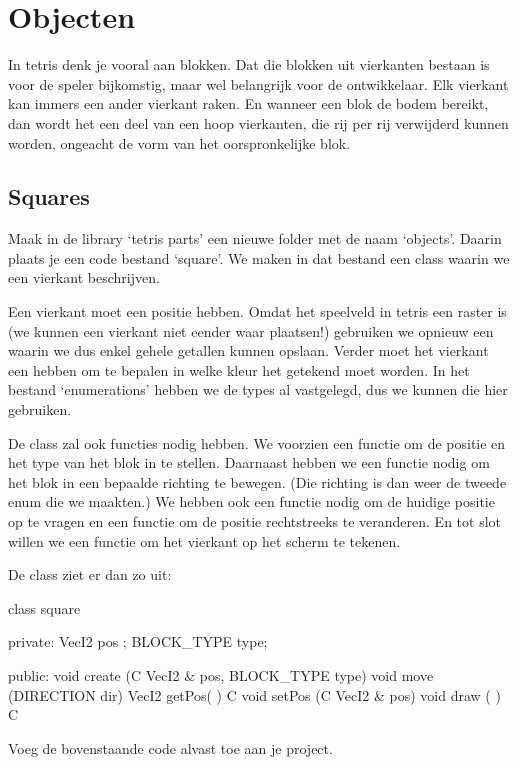 \chapter{Objecten}
In tetris denk je vooral aan blokken. Dat die blokken uit vierkanten bestaan is voor de speler bijkomstig, maar wel belangrijk voor de ontwikkelaar. Elk vierkant kan immers een ander vierkant raken. En wanneer een blok de bodem bereikt, dan wordt het een deel van een hoop vierkanten, die rij per rij verwijderd kunnen worden, ongeacht de vorm van het oorspronkelijke blok.

\section{Squares}
Maak in de library `tetris parts' een nieuwe folder met de naam `objects'. Daarin plaats je een code bestand `square'. We maken in dat bestand een class  waarin we een vierkant beschrijven.

Een vierkant moet een positie hebben. Omdat het speelveld in tetris een raster is (we kunnen een vierkant niet eender waar plaatsen!) gebruiken we opnieuw een  waarin we dus enkel gehele getallen kunnen opslaan. Verder moet het vierkant een  hebben om te bepalen in welke kleur het getekend moet worden. In het bestand `enumerations' hebben we de types al vastgelegd, dus we kunnen die hier gebruiken.

De class  zal ook functies nodig hebben. We voorzien een  functie om de positie en het type van het blok in te stellen. Daarnaast hebben we een  functie nodig om het blok in een bepaalde richting te bewegen. (Die richting is dan weer de tweede enum die we maakten.) We hebben ook een functie nodig om de huidige positie op te vragen en een functie om de positie rechtstreeks te veranderen. En tot slot willen we een functie om het vierkant op het scherm te tekenen.

De class ziet er dan zo uit:

\begin{code}
class square
{
private:
   VecI2      pos ; 
   BLOCK_TYPE type;
   
public:
   void create (C VecI2 & pos, BLOCK_TYPE type) { }
   void move   (DIRECTION dir)   { }
   VecI2 getPos(             ) C { }
   void setPos (C VecI2 & pos)   { }
	 void draw   (             ) C { }
}
\end{code}

Voeg de bovenstaande code alvast toe aan je project. 

